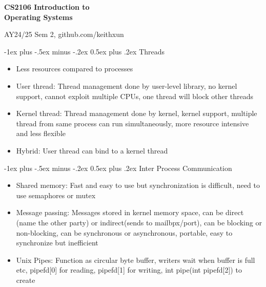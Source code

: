 \documentclass[10pt, landscape]{article}
\makeatletter
\renewcommand{\section}{\@startsection{section}{1}{0mm}%
                                {-1ex plus -.5ex minus -.2ex}%
                                {0.5ex plus .2ex}%
                                {\normalfont\large\bfseries}}
\makeatother
\begin{document}
\raggedright
\footnotesize
\begin{multicols*}{3}

\setlength{\premulticols}{1pt}
\setlength{\postmulticols}{1pt}
\setlength{\multicolsep}{1pt}
\setlength{\columnsep}{2pt}


\begin{center}
     \Large{\textbf{CS2106 Introduction to \\
     				 Operating Systems}} \\
\end{center}
AY24/25 Sem 2, github.com/keithxun

\section{Threads}
\begin{itemize}
	\item Less resources compared to processes
	\item User thread: Thread management done by user-level library, no kernel support, cannot exploit multiple CPUs, one thread will block other threads
	\item Kernel thread: Thread management done by kernel, kernel support, multiple thread from same process can run simultaneously, more resource intensive and less flexible
	\item Hybrid: User thread can bind to a kernel thread 
\end{itemize}

\section{Inter Process Communication}
\begin{itemize}
	\item Shared memory: Fast and easy to use but synchronization is difficult, need to use semaphores or mutex
	\item Message passing: Messages stored in kernel memory space, can be direct (name the other party) or indirect(sends to mailbpx/port), can be blocking or non-blocking, can be synchronous or asynchronous, portable, easy to synchronize but inefficient
	\item Unix Pipes: Function as circular byte buffer, writers wait when buffer is full etc, pipefd[0] for reading, pipefd[1] for writing, int pipe(int pipefd[2]) to create  
\end{itemize}


\end{multicols*}
\end{document}

